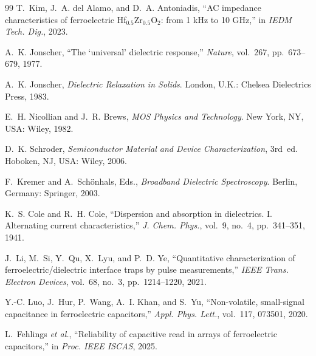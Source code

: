 \documentclass[journal]{IEEEtran}
\newcommand{\hzo}{Hf$_{0.5}$Zr$_{0.5}$O$_{2}$}
\begin{document}
\begin{thebibliography}{99}
T.~Kim, J.~A. del Alamo, and D.~A. Antoniadis,
``AC impedance characteristics of ferroelectric \hzo{}: from 1 kHz to
10 GHz,'' in \emph{IEDM Tech. Dig.}, 2023.

A.~K. Jonscher,
``The `universal' dielectric response,''
\emph{Nature}, vol.~267, pp.~673--679, 1977.

A.~K. Jonscher,
\emph{Dielectric Relaxation in Solids}.
London, U.K.: Chelsea Dielectrics Press, 1983.

E.~H. Nicollian and J.~R. Brews,
\emph{MOS Physics and Technology}.
New York, NY, USA: Wiley, 1982.

D.~K. Schroder,
\emph{Semiconductor Material and Device Characterization}, 3rd~ed.
Hoboken, NJ, USA: Wiley, 2006.

F.~Kremer and A.~Sch\"onhals, Eds.,
\emph{Broadband Dielectric Spectroscopy}.
Berlin, Germany: Springer, 2003.

K.~S. Cole and R.~H. Cole,
``Dispersion and absorption in dielectrics. I. Alternating current
characteristics,'' \emph{J. Chem. Phys.}, vol.~9, no.~4, pp.~341--351, 1941.

J.~Li, M.~Si, Y.~Qu, X.~Lyu, and P.~D. Ye,
``Quantitative characterization of ferroelectric/dielectric interface traps by
pulse measurements,'' \emph{IEEE Trans. Electron Devices}, vol.~68, no.~3,
pp.~1214--1220, 2021.

Y.-C. Luo, J.~Hur, P.~Wang, A.~I. Khan, and S.~Yu,
``Non-volatile, small-signal capacitance in ferroelectric capacitors,''
\emph{Appl. Phys. Lett.}, vol.~117, 073501, 2020.

L.~Fehlings \emph{et al.},
``Reliability of capacitive read in arrays of ferroelectric capacitors,''
in \emph{Proc. IEEE ISCAS}, 2025.

\end{thebibliography}
\end{document}
